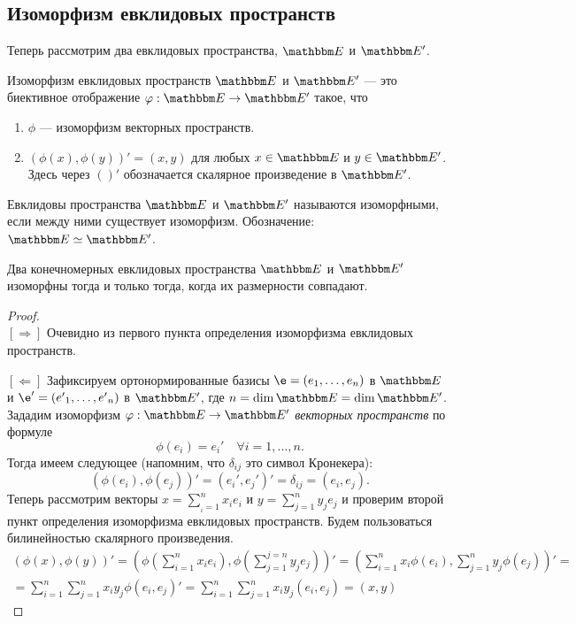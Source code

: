 \subsection*{Изоморфизм евклидовых пространств}

Теперь рассмотрим два евклидовых пространства, $\E$ и $\E'$.
\begin{Def}
Изоморфизм евклидовых пространств $\E$ и $\E'$  --- это биективное отображение $\phi: \E \rightarrow \E'$ такое, что
\begin{enumerate}
\item $\phi$ --- изоморфизм векторных пространств.
\item $(\phi(x), \phi(y))' = (x, y)$ для любых $x \in \E$ и $y \in \E'$. Здесь через $()'$ обозначается скалярное произведение в $\E'$.
\end{enumerate}
\end{Def}

\begin{Def}
Евклидовы пространства $\E$ и $\E'$ называются изоморфными, если между ними существует изоморфизм. Обозначение: $\E \simeq \E'$.
\end{Def}

\begin{Theorem}
Два конечномерных евклидовых пространства $\E$ и $\E'$ изоморфны тогда и только тогда, когда их размерности совпадают.
\end{Theorem}

\begin{proof}\ \\
$[\Rightarrow]$ Очевидно из первого пункта определения изоморфизма евклидовых пространств.

$[\Leftarrow]$ Зафиксируем ортонормированные базисы $\e = \vector{e}$ в $\E$ и $\e' = \vector{e'}$ в $\E'$, где $n = \dim \E = \dim \E'$. Зададим изоморфизм $\phi: \E \rightarrow \E'$ \textit{векторных пространств} по формуле
$$
\phi(e_i) = e_i'\quad \forall i = 1,\ldots, n.
$$
Тогда имеем следующее (напомним, что $\delta_{ij}$ это символ Кронекера):
$$
(\phi(e_i), \phi(e_j))' = (e_i', e_j')' = \delta_{ij} = (e_i, e_j).
$$
Теперь рассмотрим векторы $x = \sum_{_i = 1}^{n}x_ie_i$ и $y = \sum_{j = 1}^{n}y_je_j$ и проверим второй пункт определения изоморфизма евклидовых пространств. Будем пользоваться билинейностью скалярного произведения.
\begin{gather*}
(\phi(x), \phi(y))' = \left(\phi\left(\sum_{i = 1}^{n}x_ie_i\right), \phi\left(\sum_{j = 1}^{j = n}y_je_j\right)\right)' = \left(\sum_{i = 1}^{n}x_i\phi(e_i), \sum_{j = 1}^{n}y_j\phi(e_j)\right)' = \\
= \sum_{i = 1}^{n}\sum_{j = 1}^{n}x_iy_j\phi(e_i, e_j)' = \sum_{i = 1}^{n}\sum_{j = 1}^{n}x_iy_j(e_i, e_j) = (x, y)
\end{gather*}
\end{proof}

